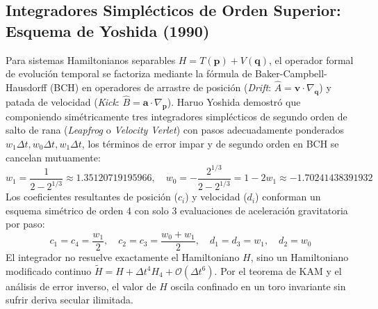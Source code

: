 \documentclass[11pt,a4paper]{article}
\begin{document}
\subsection{Integradores Simplécticos de Orden Superior: Esquema de Yoshida (1990)}
Para sistemas Hamiltonianos separables $H = T(\mathbf{p}) + V(\mathbf{q})$, el operador formal de evolución temporal se factoriza mediante la fórmula de Baker-Campbell-Hausdorff (BCH) en operadores de arrastre de posición (\textit{Drift}: $\hat{A} = \mathbf{v} \cdot \nabla_{\mathbf{q}}$) y patada de velocidad (\textit{Kick}: $\hat{B} = \mathbf{a} \cdot \nabla_{\mathbf{p}}$).
Haruo Yoshida \cite{yoshida1990} demostró que componiendo simétricamente tres integradores simplécticos de segundo orden de salto de rana (\textit{Leapfrog} o \textit{Velocity Verlet}) con pasos adecuadamente ponderados $w_1 \Delta t, w_0 \Delta t, w_1 \Delta t$, los términos de error impar y de segundo orden en BCH se cancelan mutuamente:
\begin{equation}
    w_1 = \frac{1}{2 - 2^{1/3}} \approx 1.35120719195966, \quad w_0 = -\frac{2^{1/3}}{2 - 2^{1/3}} = 1 - 2w_1 \approx -1.70241438391932
\end{equation}
Los coeficientes resultantes de posición ($c_i$) y velocidad ($d_i$) conforman un esquema simétrico de orden 4 con solo 3 evaluaciones de aceleración gravitatoria por paso:
\begin{equation}
    c_1 = c_4 = \frac{w_1}{2}, \quad c_2 = c_3 = \frac{w_0 + w_1}{2}, \quad d_1 = d_3 = w_1, \quad d_2 = w_0
\end{equation}
El integrador no resuelve exactamente el Hamiltoniano $H$, sino un Hamiltoniano modificado continuo $\tilde{H} = H + \Delta t^4 H_4 + \mathcal{O}(\Delta t^6)$. Por el teorema de KAM y el análisis de error inverso, el valor de $H$ oscila confinado en un toro invariante sin sufrir deriva secular ilimitada.
\end{document}
